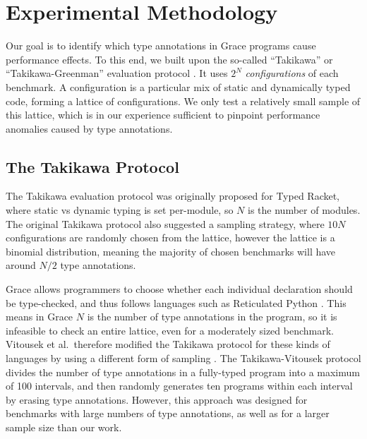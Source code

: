 \documentclass[sigplan,screen]{acmart}
\begin{document}
\section{Experimental Methodology}
\label{s-meth}

Our goal is to identify which type annotations in Grace programs
cause performance effects.
To this end, we built upon the so-called ``Takikawa'' or ``Takikawa-Greenman'' evaluation protocol \cite{Takikawa2016,Greenman2019jfp}.
It uses $2^N$ \emph{configurations} of each benchmark.
A configuration is a particular mix of static and dynamically typed code, forming a lattice of configurations.
We only test a relatively small sample of this lattice,
which is in our experience sufficient to pinpoint performance anomalies caused
by type annotations.

\subsection{The Takikawa Protocol}
The Takikawa evaluation protocol was originally proposed for Typed
Racket, where static vs dynamic typing is set per-module, so $N$ is
the number of modules. The original Takikawa protocol also suggested a sampling strategy, where $10N$ configurations are randomly chosen from the lattice, however the lattice is a binomial distribution, meaning the majority of chosen benchmarks will have around $N/2$ type annotations.

Grace allows programmers to choose whether each individual declaration should be type-checked, and thus follows languages such as
Reticulated Python \cite{reticPython2014,monotonic2015,Vitousek2017}.
This means in Grace $N$ is the number of type annotations in the program, so it is
infeasible to check an entire lattice, even for a moderately sized benchmark.
Vitousek et al.\ therefore modified the Takikawa protocol for
these kinds of languages by using a different form of sampling
\cite{vitousek-transient-arXive-2019}.  The Takikawa-Vitousek protocol
divides the number of type annotations in a fully-typed program into
a maximum of 100 intervals, and then randomly generates ten programs within
each interval by erasing type annotations.
However, this approach was designed for benchmarks with large numbers of type annotations, as well as for a larger sample size than our work.

\end{document}
